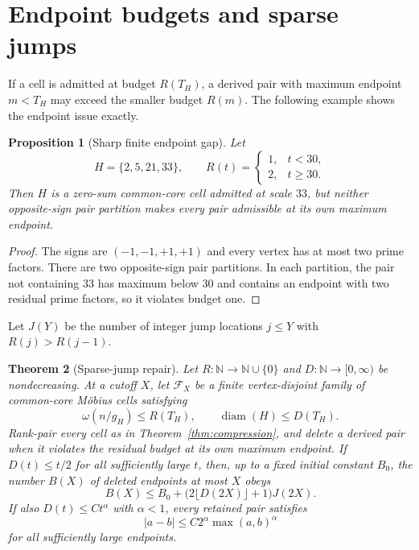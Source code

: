 \documentclass[11pt,a4paper]{amsart}
\newtheorem{theorem}{Theorem}[section]
\newtheorem{proposition}[theorem]{Proposition}
\theoremstyle{definition}
\theoremstyle{remark}
\newcommand{\N}{\mathbb N}
\newcommand{\om}{\omega}
\begin{document}
\section{Endpoint budgets and sparse jumps}

If a cell is admitted at budget $R(T_H)$, a derived pair with maximum
endpoint $m<T_H$ may exceed the smaller budget $R(m)$.  The following example
shows the endpoint issue exactly.

\begin{proposition}[Sharp finite endpoint gap]\label{prop:gap}
Let
\[
 H=\{2,5,21,33\},\qquad
 R(t)=\begin{cases}1,&t<30,\\2,&t\geq30.\end{cases}
\]
Then $H$ is a zero-sum common-core cell admitted at scale $33$, but neither
opposite-sign pair partition makes every pair admissible at its own maximum
endpoint.
\end{proposition}

\begin{proof}
The signs are $(-1,-1,+1,+1)$ and every vertex has at most two prime
factors.  There are two opposite-sign pair partitions.  In each partition,
the pair not containing $33$ has maximum below $30$ and contains an endpoint
with two residual prime factors, so it violates budget one.
\end{proof}

Let $J(Y)$ be the number of integer jump locations $j\leq Y$ with
$R(j)>R(j-1)$.

\begin{theorem}[Sparse-jump repair]\label{thm:sparse-jump}
Let $R:\N\to\N\cup\{0\}$ and $D:\N\to[0,\infty)$ be nondecreasing.  At a
cutoff $X$, let $\mathcal F_X$ be a finite vertex-disjoint family of
common-core M\"obius cells satisfying
\[
 \om(n/g_H)\leq R(T_H),\qquad
 \operatorname{diam}(H)\leq D(T_H).
\]
Rank-pair every cell as in Theorem~\ref{thm:compression}, and delete a derived
pair when it violates the residual budget at its own maximum endpoint.  If
$D(t)\leq t/2$ for all sufficiently large $t$, then, up to a fixed initial
constant $B_0$, the number $B(X)$ of deleted endpoints at most $X$ obeys
\begin{equation}\label{eq:jump-bound}
 B(X)\leq B_0+\bigl(2\lfloor D(2X)\rfloor+1\bigr)J(2X).
\end{equation}
If also $D(t)\leq Ct^\alpha$ with $\alpha<1$, every retained pair satisfies
\begin{equation}\label{eq:inherited-gap}
 |a-b|\leq C2^\alpha\max(a,b)^\alpha
\end{equation}
for all sufficiently large endpoints.
\end{theorem}
\end{document}
